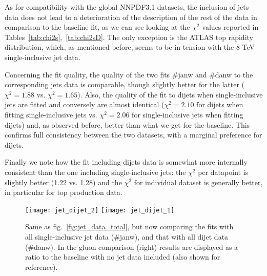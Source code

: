 %
As for compatibility with the global NNPDF3.1 datasets, the inclusion of jets data does not lead to a deterioration
of the description of the rest of the data in comparison to the baseline fit, as we can see looking at the $\chi^2$
values reported in Tables~\ref{tab:chi2s},~\ref{tab:chi2sD}.
The only exception is the ATLAS top rapidity distribution, which, as mentioned before,
seems to be in tension with the 8 TeV single-inclusive jet data.

%
Concerning the fit quality, the quality of the two fits \#janw and \#danw to the corresponding jets data is comparable,
though slightly better for the latter ($\chi^2=1.88$ vs. $\chi^2=1.65$). Also, the quality of the fit to dijets 
when single-inclusive jets are fitted and conversely are almost identical ($\chi^2=2.10$ for dijets when fitting
single-inclusive jets vs. $\chi^2=2.06$ for single-inclusive jets when fitting dijets) and, as observed before,
better than what we get for the baseline.
This confirms full consistency between the two datasets, with a marginal preference for dijets.

%
Finally we note how the fit including dijets data is somewhat more internally consistent than the one including
single-inclusive jets: the $\chi^2$ per datapoint is slightly better (1.22 vs. 1.28) and the $\chi^2$ for individual
dataset is generally better, in particular for top production data.

\begin{figure}[!t]
    \centering
    \texttt{[image: jet\_dijet\_2]}
    \texttt{[image: jet\_dijet\_1]}\\
    \caption{Same as fig.~\ref{fig:jet_data_total}, but now comparing the
      fits with  all single-inclusive jet data (\#janw), and that with all
      dijet data (\#danw).
      In the gluon comparison (right) results are
      displayed as a ratio to the baseline with no jet data included (also
      shown for reference).}
    \label{fig:jet_dijet_1}
\end{figure}


